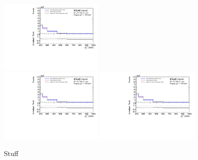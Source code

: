 \begin{figure}[h!]
  \includegraphics[page=561,width=0.45\textwidth]{figures/IBUClosureTests.pdf} \\
  \includegraphics[page=567,width=0.45\textwidth]{figures/IBUClosureTests.pdf}
  \includegraphics[page=573,width=0.45\textwidth]{figures/IBUClosureTests.pdf}
  \caption{Stuff}
  \label{fig:DDTestDilep}
\end{figure}

